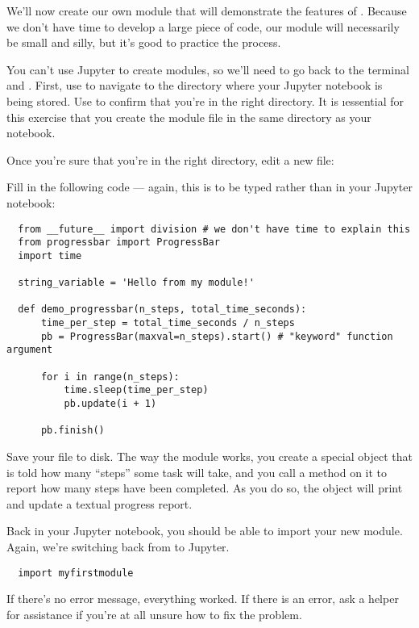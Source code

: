 \documentclass[letterpaper, 12pt, titlepage, twoside]{article}
\begin{document}
We'll now create our own module that will demonstrate the features of
. Because we don't have time to develop a large piece of code,
our module will necessarily be small and silly, but it's good to practice the
process.

You can't use Jupyter to create modules, so we'll need to go back to the
terminal and . First, use  to navigate to the directory where
your Jupyter notebook is being stored. Use  to confirm that you're in
the right directory. It is \i{essential} for this exercise that you create the
module file in the same directory as your notebook.

Once you're sure that you're in the right directory, edit a new file:


Fill in the following code --- again, this is to be typed  rather
than in your Jupyter notebook:

\begin{lstlisting}
  from __future__ import division # we don't have time to explain this
  from progressbar import ProgressBar
  import time

  string_variable = 'Hello from my module!'

  def demo_progressbar(n_steps, total_time_seconds):
      time_per_step = total_time_seconds / n_steps
      pb = ProgressBar(maxval=n_steps).start() # "keyword" function argument

      for i in range(n_steps):
          time.sleep(time_per_step)
          pb.update(i + 1)

      pb.finish()
\end{lstlisting}

Save your file to disk. The way the  module works, you create a
special object that is told how many ``steps'' some task will take, and you
call a method  on it to report how many steps have been completed.
As you do so, the object will print and update a textual progress report.

Back in your Jupyter notebook, you should be able to import your new module.
Again, we're switching back from  to Jupyter.

\begin{lstlisting}
  import myfirstmodule
\end{lstlisting}

If there's no error message, everything worked. If there is an error, ask a
helper for assistance if you're at all unsure how to fix the problem.
\end{document}

